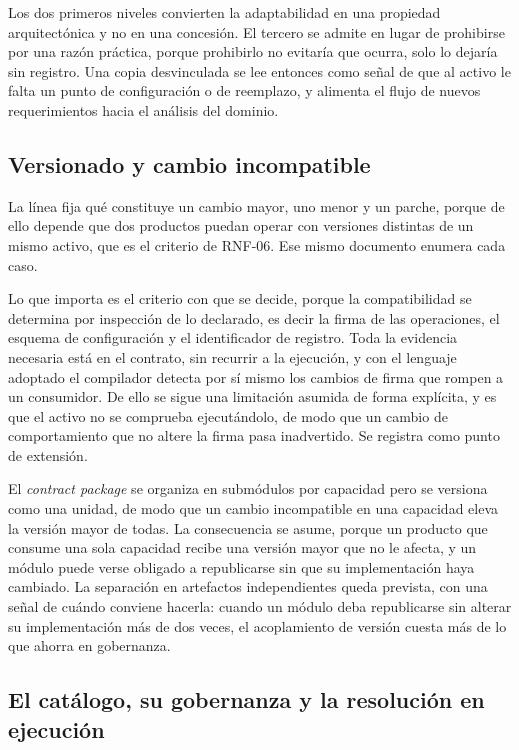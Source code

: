 Los dos primeros niveles convierten la adaptabilidad en una propiedad
arquitectónica y no en una concesión. El tercero se admite en lugar de
prohibirse por una razón práctica, porque prohibirlo no evitaría que ocurra,
solo lo dejaría sin registro. Una copia desvinculada se lee entonces como
señal de que al activo le falta un punto de configuración o de reemplazo, y
alimenta el flujo de nuevos requerimientos hacia el análisis del dominio.

\subsection{Versionado y cambio incompatible}

La línea fija qué constituye un cambio mayor, uno menor y un parche, porque
de ello depende que dos productos puedan operar con versiones distintas de un
mismo activo, que es el criterio de RNF-06. Ese mismo documento enumera cada caso.

Lo que importa es el criterio con que se decide, porque la compatibilidad se
determina por inspección de lo declarado, es decir la firma de las
operaciones, el esquema de configuración y el identificador de registro. Toda
la evidencia necesaria está en el contrato, sin recurrir a la ejecución, y
con el lenguaje adoptado el compilador detecta por sí mismo los cambios de
firma que rompen a un consumidor. De ello se sigue una limitación asumida de
forma explícita, y es que el activo no se comprueba ejecutándolo, de modo que
un cambio de comportamiento que no altere la firma pasa inadvertido. Se registra
como punto de extensión.

El \emph{contract package} se organiza en submódulos por capacidad pero se
versiona como una unidad, de modo que un cambio incompatible en una capacidad
eleva la versión mayor de todas. La consecuencia se asume, porque un producto
que consume una sola capacidad recibe una versión mayor que no le afecta, y
un módulo puede verse obligado a republicarse sin que su implementación haya
cambiado. La separación en artefactos independientes queda prevista, con una
señal de cuándo conviene hacerla: cuando un módulo deba republicarse sin
alterar su implementación más de dos veces, el acoplamiento de versión cuesta
más de lo que ahorra en gobernanza.

\subsection{El catálogo, su gobernanza y la resolución en ejecución}
\label{sec:catalogo-operacion}

